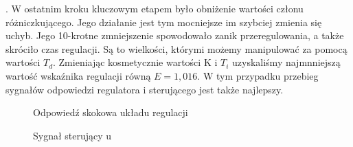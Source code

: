 . W ostatnim kroku kluczowym etapem było obniżenie wartości członu różniczkującego. Jego działanie jest tym mocniejsze im szybciej zmienia się uchyb. Jego 10-krotne zmniejszenie spowodowało zanik przeregulowania, a także skróciło czas regulacji. Są to wielkości, którymi możemy manipulować za pomocą wartości $T_{d}$. Zmieniając kosmetycznie wartości K i $T_{i}$ uzyskaliśmy najmnniejszą wartość wskaźnika regulacji równą $E=1,016$. W tym przypadku przebieg sygnałów odpowiedzi regulatora i sterującego jest także najlepszy. 
\begin{figure}[h]
    \centering
    \caption{Odpowiedź skokowa układu regulacji}
    \label{zad5_niegasnące_oscylacje}
\end{figure}

\begin{figure}[h]
    \centering
    \caption{Sygnał sterujący u}
    \label{zad2_stat_wykres}
\end{figure}
\FloatBarrier
\fi